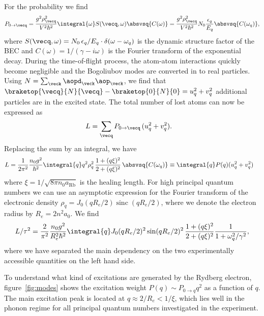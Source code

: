 For the probability we find
\begin{align}
P_{0\rightarrow\vecq}=\frac{g^2 \rho_{\vecq}^2 }{V^2\hbar^2}   \integral{\omega}S(\vecq,\omega)\absvsq{C(\omega)} = \frac{g^2 \rho_{\vecq}^2}{V^2\hbar^2} N_0 \frac{\epsilon_{q}}{E_{q}} \absvsq{C(\omega_q)},
\end{align}
where $S({\vecq},\omega)=N_0 \,\epsilon_{q}/E_{q} \cdot \delta(\omega-\omega_{q})$ is the dynamic structure factor of the BEC and $C(\omega)=1/(\gamma-i \omega)$ is the Fourier transform of the exponential decay.
During the time-of-flight process, the atom-atom interactions quickly become negligible and the Bogoliubov modes are converted in to real particles. Using $N=\sum_{\veck} \aopd_{\veck}\aop_{\veck}$, we find that $\braketop{\vecq}{N}{\vecq}-\braketop{0}{N}{0} = u_{q}^2+v_{q}^2$ additional particles are in the excited state. The total number of lost atoms can now be expressed as
\begin{align}
L &= \sum_{\vecq} P_{0\rightarrow\vecq}\, (u_{q}^2+v_{q}^2).
\end{align}
Replacing the sum by an integral, we have
\begin{align}
L&= \frac{1}{2\pi^2}\frac{n_0 g^2}{\hbar^2} \integral{q} q^2\rho_q^2\,\frac{1+(q\xi)^2}{2+(q\xi)^2} \, \absvsq{C(\omega_q)}  \equiv \integral{q} P(q) (u_{q}^2+v_{q}^2)
\end{align}
where $\xi=1/\sqrt{8\pi n_0 a_{\text{Rb}}}$ is the healing length. For high principal quantum numbers we can use an asymptotic expression for the Fourier transform of the electronic density $\rho_q=J_0(q R_e/2) \operatorname{sinc}(q R_e/2)$, where we denote the electron radius by $R_e=2n^2 a_0$. We find
\begin{align} \label{eq:lostpertau2}
L/\tau^2 = \frac{2}{\pi^2}\frac{n_0 g^2}{R_e^2 \hbar^2}\integral{q} J_0(q R_e/2)^2 \sin(q R_e/2)^2 \,\frac{1+(q\xi)^2}{2+(q\xi)^2} \frac{1}{1+\omega_q^2/\gamma^2},
\end{align}
where we have separated the main dependency on the two experimentally accessible quantities on the left hand side.


To understand what kind of excitations are generated by the Rydberg electron, figure~\ref{fig:modes} shows the excitation weight $P(q)\sim P_{0\rightarrow q} q^2$ as a function of $q$. The main excitation peak is located at $q\approx 2/R_e < 1/\xi$, which lies well in the phonon regime for all principal quantum numbers investigated in the experiment.








